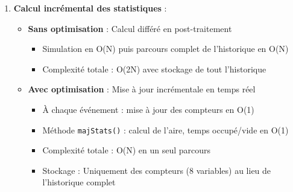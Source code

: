 \documentclass[12pt,a4paper]{article}
\begin{document}
\begin{enumerate}
\begin{itemize}
        \begin{itemize}
            \item Coût mémoire : 24 octets/élément (objet \texttt{Double} + référence)
            \item Complexité : O(1) avec indirection mémoire + conversions primitif/objet
            \item Mauvaise localité cache (objets dispersés en mémoire)
        \end{itemize}
        \item \textbf{Avec optimisation} : \texttt{double[]} (tableau de primitifs)
        \begin{itemize}
            \item Coût mémoire : 8 octets/élément (valeur primitive directe)
            \item Complexité : O(1) direct, sans indirection ni conversion
            \item Excellente localité cache (valeurs contiguës en mémoire)
            \item Économie: Moins de mémoire utilisée.
        \end{itemize}
    \end{itemize}
    
    \vspace{0.3cm}
    \item \textbf{Calcul incrémental des statistiques} :
    \begin{itemize}
        \item \textbf{Sans optimisation} : Calcul différé en post-traitement
        \begin{itemize}
            \item Simulation en O(N) puis parcours complet de l'historique en O(N)
            \item Complexité totale : O(2N) avec stockage de tout l'historique
        \end{itemize}
        \item \textbf{Avec optimisation} : Mise à jour incrémentale en temps réel
        \begin{itemize}
            \item À chaque événement : mise à jour des compteurs en O(1)
            \item Méthode \texttt{majStats()} : calcul de l'aire, temps occupé/vide en O(1)
            \item Complexité totale : O(N) en un seul parcours
            \item Stockage : Uniquement des compteurs (8 variables) au lieu de l'historique complet
        \end{itemize}
    \end{itemize}
\end{enumerate}
\end{document}

